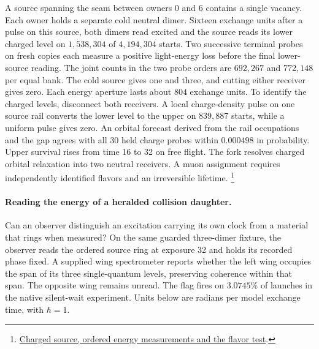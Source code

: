 \documentclass[11pt]{article}
\theoremstyle{definition}
\theoremstyle{remark}
\theoremstyle{plain}
\begin{document}
A source spanning the seam between owners 0 and 6 contains a single vacancy.
Each owner holds a separate cold neutral dimer. Sixteen exchange units
after a pulse on this source, both dimers read excited and the source
reads its lower charged level on $1{,}538{,}304$ of $4{,}194{,}304$
starts. Two successive terminal probes on fresh copies each measure
a positive light-energy loss before the final lower-source reading.
The joint counts in the two probe orders are $692{,}267$ and $772{,}148$
per equal bank. The cold source gives one and three, and cutting either
receiver gives zero. Each energy aperture lasts about $804$ exchange
units. To identify the charged levels, disconnect both receivers. A
local charge-density pulse on one source rail converts the lower level
to the upper on $839{,}887$ starts, while a uniform pulse gives zero.
An orbital forecast derived from the rail occupations and the gap agrees
with all 30 held charge probes within $0.000498$ in probability. Upper
survival rises from time 16 to 32 on free flight. The fork resolves
charged orbital relaxation into two neutral receivers. A muon assignment
requires independently identified flavors and an irreversible lifetime.%
\footnote{\href{https://github.com/FloatingPragma/observer-patch-holography/tree/main/model/candidate_laws/interval_echo/openwave/row_24_decay/fork}{Charged source, ordered energy measurements and the flavor test}.}

\paragraph{Reading the energy of a heralded collision daughter.}
Can an observer distinguish an excitation carrying its own clock from
a material that rings when measured? On the same guarded three-dimer
fixture, the observer reads the ordered source ring at exposure 32 and
holds its recorded phase fixed. A supplied wing spectrometer reports
whether the left wing occupies the span of its three single-quantum
levels, preserving coherence within that span. The opposite wing
remains unread. The flag fires on $3.0745\%$ of launches in the
native silent-wait experiment. Units below are radians per model
exchange time, with $\hbar=1$.
\end{document}
